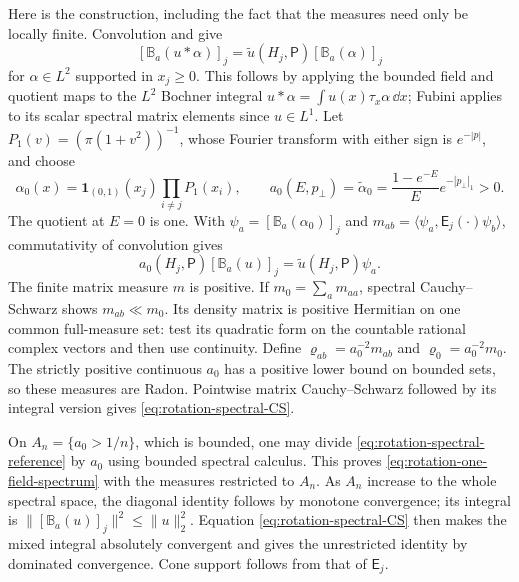 Here is the construction, including the fact that the measures
need only be locally finite. Convolution and
 give
\[
 [\mathbb B_a(u*\alpha)]_j
       =\widetilde u(H_j,\mathsf P)[\mathbb B_a(\alpha)]_j
\]
for $\alpha\in L^2$ supported in $x_j\ge0$.
This follows by applying the bounded field and quotient maps to
the $L^2$ Bochner integral
$u*\alpha=\int u(x)\tau_x\alpha\,\dd x$;
Fubini applies to its scalar spectral matrix elements since
$u\in L^1$.
Let $P_1(v)=(\pi(1+v^2))^{-1}$, whose Fourier transform with
either sign is $e^{-|p|}$, and choose
\[
 \alpha_0(x)=\mathbf1_{(0,1)}(x_j)\prod_{i\ne j}P_1(x_i),
 \qquad
 a_0(E,p_\perp)=\widetilde\alpha_0
       =\frac{1-e^{-E}}{E}e^{-|p_\perp|_1}>0.
\]
The quotient at $E=0$ is one. With
$\psi_a=[\mathbb B_a(\alpha_0)]_j$ and
$m_{ab}=\langle\psi_a,\mathsf E_j(\cdot)\psi_b\rangle$,
commutativity of convolution gives
\begin{equation}\label{eq:rotation-spectral-reference}
 a_0(H_j,\mathsf P)[\mathbb B_a(u)]_j
       =\widetilde u(H_j,\mathsf P)\psi_a.
\end{equation}
The finite matrix measure $m$ is positive. If $m_0=\sum_a m_{aa}$,
spectral Cauchy--Schwarz shows $m_{ab}\ll m_0$.
Its density matrix is positive Hermitian on one common full-measure
set: test its quadratic form on the countable rational complex
vectors and then use continuity. Define
$\varrho_{ab}=a_0^{-2}m_{ab}$ and $\varrho_0=a_0^{-2}m_0$.
The strictly positive continuous $a_0$ has a positive lower bound
on bounded sets, so these measures are Radon.
Pointwise matrix Cauchy--Schwarz followed by its integral version
gives \eqref{eq:rotation-spectral-CS}.

On $A_n=\{a_0>1/n\}$, which is bounded, one may divide
\eqref{eq:rotation-spectral-reference} by $a_0$ using bounded
spectral calculus. This proves \eqref{eq:rotation-one-field-spectrum}
with the measures restricted to $A_n$.
As $A_n$ increase to the whole spectral space,
the diagonal identity follows by monotone convergence; its integral
is $\|[\mathbb B_a(u)]_j\|^2\le\|u\|_2^2$.
Equation \eqref{eq:rotation-spectral-CS} then makes the mixed
integral absolutely convergent and gives the unrestricted identity
by dominated convergence. Cone support follows from that of
$\mathsf E_j$.

